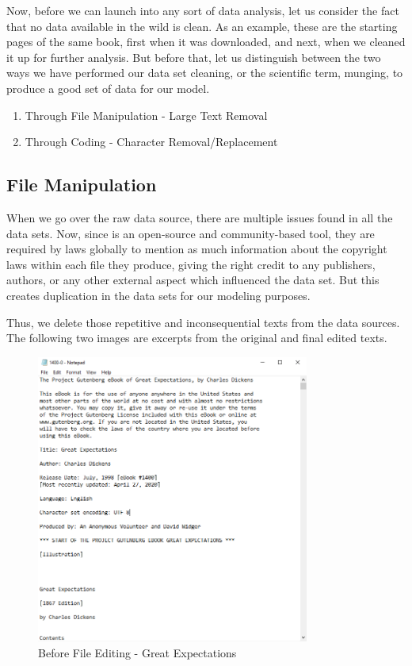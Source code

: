 Now, before we can launch into any sort of data analysis, let us consider the fact that no data available in the wild is clean. As an example, these are the starting pages of the same book, first when it was downloaded, and next, when we cleaned it up for further analysis. But before that, let us distinguish between the two ways we have performed our data set cleaning, or the scientific term, munging, to produce a good set of data for our model.

\begin{enumerate}
    \item Through File Manipulation - Large Text Removal
    \item Through Coding - Character Removal/Replacement
\end{enumerate}

\subsection{File Manipulation}
\label{sec:data-clean-files}

When we go over the raw data source, there are multiple issues found in all the data sets. Now, since \textcite{project-gutenburg} is an open-source and community-based tool, they are required by laws globally to mention as much information about the copyright laws within each file they produce, giving the right credit to any publishers, authors, or any other external aspect which influenced the data set. But this creates duplication in the data sets for our modeling purposes. 

Thus, we delete those repetitive and inconsequential texts from the data sources. The following two images are excerpts from the original and final edited texts. 

\begin{figure}[H]
	\begin{center}
		\includegraphics[width = 0.8\textwidth]{Images/data_clean_orig.PNG} %
		\caption{Before File Editing - Great Expectations}
		\label{fig:data-clean-orig}
	\end{center}
\end{figure}


